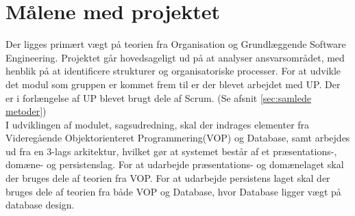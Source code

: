 \section{Målene med projektet}
Der ligges primært vægt på teorien fra Organisation og Grundlæggende Software Engineering. Projektet går hovedsageligt ud på at analyser ansvarsområdet, med henblik på at identificere strukturer og organisatoriske processer. 
For at udvikle det modul som gruppen er kommet frem til er der blevet arbejdet med UP. 
Der er i forlængelse af UP blevet brugt dele af Scrum.
(Se afsnit \ref{sec:samlede metoder})%
\\
I udviklingen af modulet, sagsudredning, skal der indrages elementer fra Videregående Objektorienteret Programmering(VOP) og Database, samt arbejdes ud fra en 3-lags arkitektur, hvilket gør at systemet består af et præsentations-, domæne- og persistenslag. 
For at udarbejde præsentations- og domænelaget skal der bruges dele af teorien fra VOP. 
For at udarbejde persistens laget skal der bruges dele af teorien fra både VOP og Database, hvor Database ligger vægt på database design.


